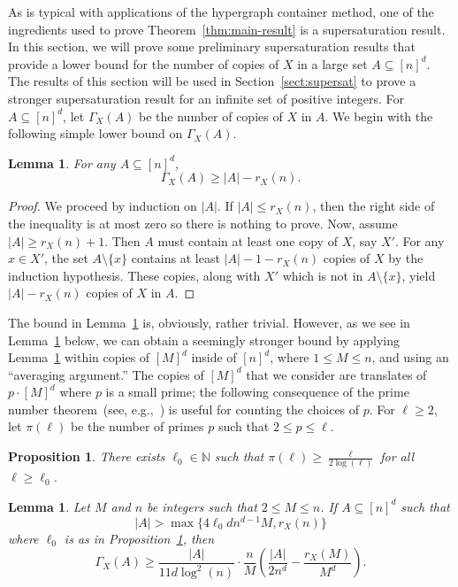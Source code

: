 \documentclass[12pt]{article}
\numberwithin{equation}{section}
\newtheorem{lem}[equation]{Lemma}
\newtheorem{prop}[equation]{Proposition}
\theoremstyle{definition}
\theoremstyle{remark}
\begin{document}
As is typical with applications of the hypergraph container method, one of the ingredients used to prove Theorem~\ref{thm:main-result} is a supersaturation result. In this section, we will prove some preliminary supersaturation results that provide a lower bound for the number of copies of $X$ in a large set $A \subseteq [n]^d$. The results of this section will be used in Section~\ref{sect:supersat} to prove a stronger supersaturation result for an infinite set of positive integers. For $A\subseteq [n]^d$, let $\Gamma_X(A)$ be the number of copies of $X$ in $A$. We begin with the following simple lower bound on $\Gamma_X(A)$. 

\begin{lem}
\label{lem:supersat1}
For any $A\subseteq [n]^d$, 
\[\Gamma_X(A)\geq |A|-r_X(n).\]
\end{lem}

\begin{proof}
We proceed by induction on $|A|$. If $|A|\leq r_X(n)$, then the right side of the inequality is at most zero so there is nothing to prove. Now, assume $|A|\geq r_X(n) + 1$. Then $A$ must contain at least one copy of $X$, say $X'$. For any $x\in X'$, the set $A\setminus\{x\}$ contains at least $|A|-1-r_X(n)$ copies of $X$ by the induction hypothesis. These copies, along with $X'$ which is not in $A \setminus \{x\}$, yield $|A|-r_X(n)$ copies of $X$ in $A$. 
\end{proof}

The bound in Lemma~\ref{lem:supersat1} is, obviously, rather trivial. However, as we see in Lemma~\ref{lem:supersatPrime} below, we can obtain a seemingly stronger bound by applying Lemma~\ref{lem:supersat1} within copies of $[M]^d$ inside of $[n]^d$, where $1\leq M\leq n$, and using an ``averaging argument.'' The copies of $[M]^d$ that we consider are translates of $p\cdot [M]^d$ where $p$ is a small prime; the following consequence of the prime number theorem~(see, e.g.,~\cite{pnt}) is useful for counting the choices of $p$. For $\ell\geq2$, let $\pi(\ell)$ be the number of primes $p$ such that $2\leq p\leq \ell$.





\begin{prop}
\label{prop:PNT}
There exists $\ell_0\in \mathbb{N}$ such that $\pi(\ell)\geq \frac{\ell}{2\log(\ell)}$ for all $\ell\geq \ell_0$.
\end{prop}

\begin{lem}
\label{lem:supersatPrime}
Let $M$ and $n$ be integers such that $2\leq M\leq n$. If $A\subseteq [n]^d$ such that 
\begin{equation}\label{eq:supersat3condition}|A|> \max\{4\ell_0dn^{d-1}M, r_X(n)\}\end{equation}
where $\ell_0$ is as in Proposition~\ref{prop:PNT}, then 
\[\Gamma_X(A)\geq \frac{|A|}{11d\log^2(n)}\cdot \frac{n}{M}\left(\frac{|A|}{2n^d} - \frac{r_X (M)}{M^d}\right).\]
\end{lem}
\end{document}
